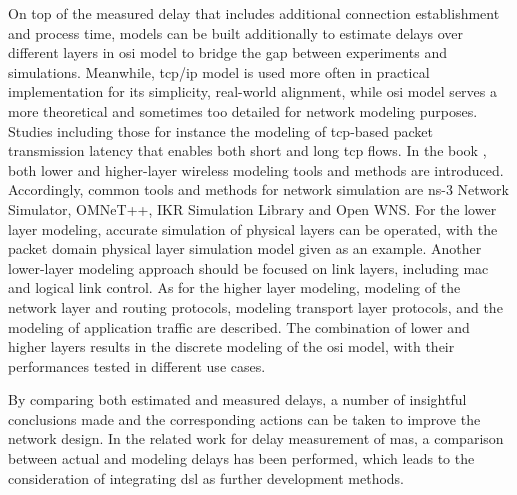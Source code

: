 On top of the measured delay 
that includes additional connection establishment and process time, 
models can be built additionally to estimate delays over different layers in 
\gls{osi} model to bridge the gap between experiments and simulations. 
Meanwhile, \gls{tcp/ip} model\cite{cerf1980protocols} is 
used more often in practical implementation 
for its simplicity, real-world alignment, while \gls{osi} model serves a more theoretical 
and sometimes too detailed for network modeling purposes. 
Studies including those for instance the modeling of \gls{tcp}-based 
packet transmission latency that enables both short and 
long \gls{tcp} flows\cite{luan_estimating_2019}. In the book \cite{wehrle2010modeling}, 
both lower and higher-layer wireless modeling tools and methods are introduced. 
Accordingly, common tools and methods for network simulation are ns-3 Network Simulator, OMNeT++, 
IKR Simulation Library and Open WNS. For the lower layer modeling, accurate simulation 
of physical layers can be operated, with the packet domain physical layer simulation 
model given as an example. Another lower-layer modeling approach should be focused on 
link layers, including \gls{mac} and logical link control. As for the higher layer 
modeling, modeling of the network layer and routing protocols, modeling 
transport layer protocols, and the modeling of application traffic are described. 
The combination of lower and higher layers results in the discrete modeling 
of the \gls{osi} model, with their performances tested in different use cases. 




By comparing both estimated and measured delays, a number of insightful 
conclusions made and the corresponding actions can be taken to improve 
the network design.
In the related work for delay measurement of \gls{mas}, 
a comparison between actual and modeling 
delays has been performed\cite{vogel-heuser_delay_2023}, which leads to the 
consideration of integrating \gls{dsl} as further development methods.





